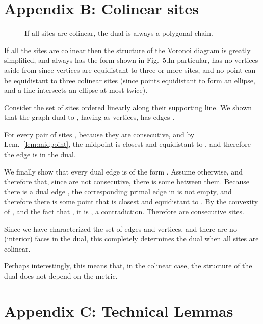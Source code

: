 \documentclass[11pt]{article}
\begin{document}
\section*{Appendix B: Colinear sites}\label{app:colinear}


\begin{figure}[ht]
\centering
{}
\caption{If all sites are colinear, the dual is always a polygonal chain.}
\end{figure}


If all the sites are colinear then the structure of the Voronoi diagram
 is
greatly simplified, and always has the form shown in
Fig.\  5.In particular,  has no vertices aside from  since 
vertices are equidistant to three or more sites, 
and no point  can be equidistant to three colinear
sites (since points equidistant to  form an ellipse, and a line
intersects an ellipse at most twice). 

Consider the set of sites  ordered linearly along
their supporting line. 
We shown that the graph dual to , having  as vertices,
has edges . 

For every pair of sites , because they are consecutive, and by Lem.~\ref{lem:midpoint}, 
the midpoint  is closest and equidistant to ,
and therefore the edge  is in the dual. 

We finally show that every dual edge  is of the form
. Assume otherwise, and therefore that, since  are
not consecutive, there is some  between them. 
Because there is a dual edge , the
corresponding primal edge  in  is not empty, and therefore there is some 
point  that is closest and equidistant to . 
By the convexity of , and the fact that , it is , a
contradiction. Therefore  are consecutive sites. 

Since we have characterized the set of edges and vertices, and
there are no (interior) faces in the dual, this completely determines the
dual when all sites are colinear. 

Perhaps interestingly, this means that, in the colinear case, the structure of the dual does not depend on the metric.









\setcounter{section}{6}
\section*{Appendix C: Technical Lemmas}\label{app:technical}
\end{document}
